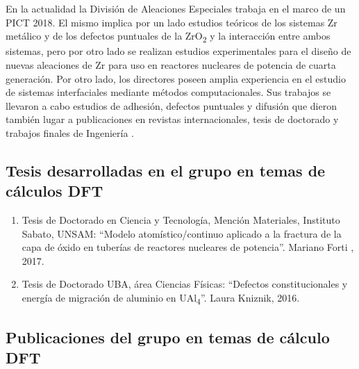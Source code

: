 En la actualidad la División de Aleaciones Especiales trabaja en el marco de un 
PICT 2018. El mismo implica por un lado
estudios teóricos de los sistemas Zr metálico y de los defectos puntuales de la 
ZrO\textsubscript{2} y la interacción entre ambos sistemas, pero por otro lado se realizan 
estudios experimentales para el diseño de nuevas aleaciones de Zr para uso en 
reactores nucleares de potencia de cuarta generación. 
Por otro lado, los directores poseen amplia experiencia en el estudio de 
sistemas interfaciales mediante métodos computacionales. Sus trabajos 
se llevaron a cabo estudios de adhesión, defectos puntuales y 
difusión que dieron también lugar a publicaciones en revistas internacionales,
tesis de doctorado y trabajos finales de Ingeniería \cite{Cotes2019}. 

\subsection{ Tesis desarrolladas en el grupo en temas de cálculos DFT}

\begin{enumerate}

\item Tesis de Doctorado en Ciencia y Tecnología, Mención Materiales, 
Instituto Sabato, UNSAM: “Modelo atomístico/continuo aplicado a la fractura de 
la capa de óxido en tuberías de reactores nucleares de potencia”. Mariano Forti 
, 2017.

\item Tesis de Doctorado UBA, área Ciencias Físicas: “Defectos 
  constitucionales y energía de migración de aluminio en UAl\textsubscript{4}”. Laura Kniznik, 
2016. 

\end{enumerate}

\subsection{ Publicaciones del grupo en temas de cálculo DFT}

